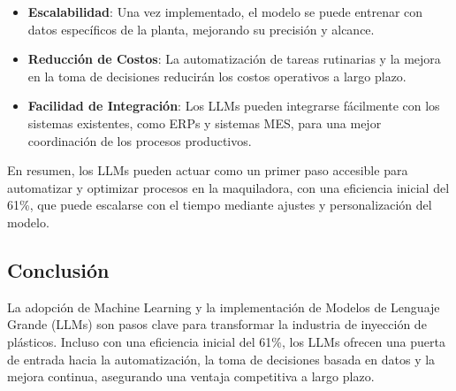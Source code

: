 \begin{itemize}
    \item \textbf{Escalabilidad}: Una vez implementado, el modelo se puede entrenar con datos específicos de la planta, mejorando su precisión y alcance.
    \item \textbf{Reducción de Costos}: La automatización de tareas rutinarias y la mejora en la toma de decisiones reducirán los costos operativos a largo plazo.
    \item \textbf{Facilidad de Integración}: Los LLMs pueden integrarse fácilmente con los sistemas existentes, como ERPs y sistemas MES, para una mejor coordinación de los procesos productivos.
\end{itemize}


En resumen, los LLMs pueden actuar como un primer paso accesible para automatizar y optimizar procesos en la maquiladora, con una eficiencia inicial del 61\%, que puede escalarse con el tiempo mediante ajustes y personalización del modelo.

\subsection{Conclusión}

La adopción de Machine Learning y la implementación de Modelos de Lenguaje Grande (LLMs) son pasos clave para transformar la industria de inyección de plásticos. Incluso con una eficiencia inicial del 61\%, los LLMs ofrecen una puerta de entrada hacia la automatización, la toma de decisiones basada en datos y la mejora continua, asegurando una ventaja competitiva a largo plazo.
